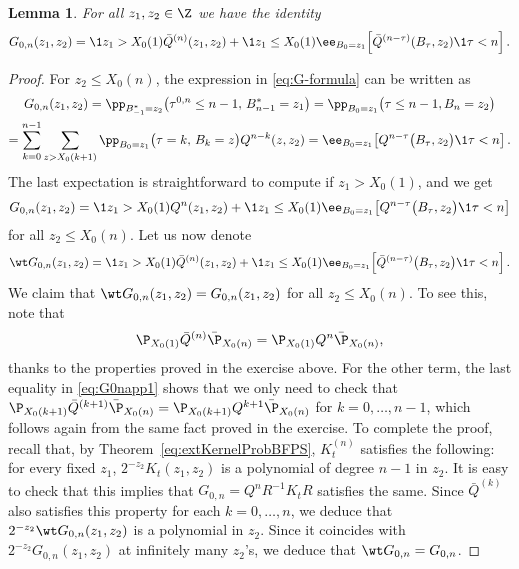 \documentclass[]{pcmi}
\theoremstyle{plain}
\newtheorem{lemma}[equation]{Lemma}
\theoremstyle{definition}
\begin{document}
\begin{lemma}\label{lem:G0n-formula}
For all $z_1,z_2\in\Z$ we have the identity
\begin{equation}
G_{0,n}(z_1,z_2) = \1{z_1>X_0(1)} \bar{Q}^{(n)}(z_1,z_2) + \1{z_1\leq X_0(1)}\ee_{B_0=z_1}\!\left[ \bar{Q}^{(n - \tau)}(B_{\tau}, z_2)\1{\tau<n}\right].
\end{equation}
\end{lemma}

\begin{proof}
For $z_2\leq X_0(n)$, the expression in \eqref{eq:G-formula} can be written as
\begin{multline}\label{eq:G0napp1}
G_{0,n}(z_1,z_2)=\pp_{B^*_{-1}=z_2}\big(\tau^{0,n}\le n-1,\,B^*_{n-1}=z_1\big)=\pp_{B_{0}=z_1}\big(\tau\leq n-1,B_{n}=z_2\big)\\
 =\sum_{k=0}^{n-1}\sum_{z>X_0(k+1)}\pp_{B_{0}=z_1}\big(\tau=k,\,B_{k}=z\big)Q^{n-k}(z,z_2)
 =\ee_{B_0=z_1}\!\left[Q^{n-\tau}\big(B_{\tau},z_2\big)\1{\tau<n}\right].
\end{multline}
The last expectation is straightforward to compute if $z_1>X_0(1)$, and we get
\begin{equation}
G_{0,n}(z_1,z_2)=\1{z_1>X_0(1)}Q^n(z_1,z_2)+\1{z_1\leq X_0(1)}\ee_{B_0=z_1}\!\left[Q^{n-\tau}\big(B_{\tau},z_2\big)\1{\tau<n}\right]
\end{equation}
for all $z_2\leq X_0(n)$.
Let us now denote
\[
\wt G_{0,n}(z_1,z_2)=\1{z_1>X_0(1)}\bar{Q}^{(n)}(z_1,z_2)+\1{z_1\leq X_0(1)}\ee_{B_0=z_1}\!\left[\bar{Q}^{(n-\tau)}\big(B_{\tau},z_2\big)\1{\tau<n}\right].
\]
We claim that $\wt G_{0,n}(z_1,z_2)=G_{0,n}(z_1,z_2)$ for all $z_2\leq X_0(n)$.
To see this,  note that 
\[
\P_{X_0(1)}\bar{Q}^{(n)}\bar\P_{X_0(n)}=\P_{X_0(1)}{Q^n}\bar\P_{X_0(n)},
\]
thanks to the properties proved in the exercise above. For the other term, the last equality in \eqref{eq:G0napp1} shows that we only need to check that $\P_{X_0(k+1)}\bar{Q}^{(k+1)}\bar\P_{X_0(n)}=\P_{X_0(k+1)}{Q^{k+1}}\bar\P_{X_0(n)}$ for $k=0,\ldots,n-1$, which follows again from the same fact proved in the exercise.
To complete the proof, recall that, by Theorem~\ref{eq:extKernelProbBFPS}, $K^{(n)}_t$ satisfies the following:  for every fixed $z_1$, $2^{-z_2}K_t(z_1,z_2)$ is a polynomial of degree $n-1$ in $z_2$.
It is easy to check that this implies that $G_{0,n}=Q^nR^{-1}K_tR$ satisfies the same.
Since $\bar{Q}^{(k)}$ also satisfies this property for each $k=0,\ldots,n$, we deduce that $2^{-z_2}\wt G_{0,n}(z_1,z_2)$ is a polynomial in $z_2$.
Since it coincides with $2^{-z_2}G_{0,n}(z_1,z_2)$ at infinitely many $z_2$'s, we deduce that $\wt G_{0,n}=G_{0,n}$.  
\end{proof}
\end{document}
